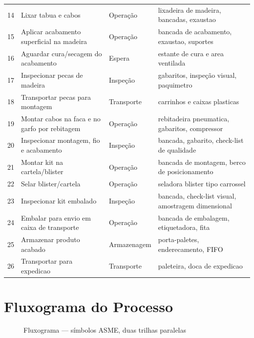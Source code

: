 \documentclass[12pt,a4paper,oneside,english,brazil]{abntex2}
\begin{document}
\begin{longtable}{p{0.6cm}p{5.5cm}p{2.8cm}p{5.5cm}}
  14 & Lixar tabua e cabos & Operação & lixadeira de madeira, bancadas, exaustao \\
  15 & Aplicar acabamento superficial na madeira & Operação & bancada de acabamento, exaustao, suportes \\
  16 & Aguardar cura/secagem do acabamento & Espera & estante de cura e area ventilada \\
  17 & Inspecionar pecas de madeira & Inspeção & gabaritos, inspeção visual, paquimetro \\
  18 & Transportar pecas para montagem & Transporte & carrinhos e caixas plasticas \\
  19 & Montar cabos na faca e no garfo por rebitagem & Operação & rebitadeira pneumatica, gabaritos, compressor \\
  20 & Inspecionar montagem, fio e acabamento & Inspeção & bancada, gabarito, check-list de qualidade \\
  21 & Montar kit na cartela/blister & Operação & bancada de montagem, berco de posicionamento \\
  22 & Selar blister/cartela & Operação & seladora blister tipo carrossel \\
  23 & Inspecionar kit embalado & Inspeção & bancada, check-list visual, amostragem dimensional \\
  24 & Embalar para envio em caixa de transporte & Operação & bancada de embalagem, etiquetadora, fita \\
  25 & Armazenar produto acabado & Armazenagem & porta-paletes, enderecamento, FIFO \\
  26 & Transportar para expedicao & Transporte & paleteira, doca de expedicao \\
\bottomrule
\end{longtable}

\chapter{Fluxograma do Processo}
\begin{figure}[H]
  \centering
  
  \caption{Fluxograma --- símbolos ASME, duas trilhas paralelas}
\end{figure}
\end{document}
